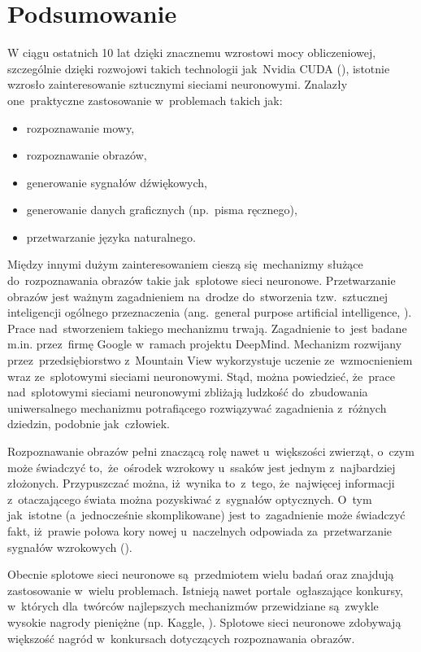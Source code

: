 \chapter{Podsumowanie}
W ciągu ostatnich 10 lat dzięki znacznemu wzrostowi mocy obliczeniowej, szczególnie dzięki rozwojowi takich technologii
jak~Nvidia CUDA (\cite{nvidia-cuda}), istotnie wzrosło zainteresowanie sztucznymi sieciami neuronowymi. Znalazły
one~praktyczne zastosowanie w~problemach takich jak:
\begin{itemize}
    \item rozpoznawanie mowy,
    \item rozpoznawanie obrazów,
    \item generowanie sygnałów dźwiękowych,
    \item generowanie danych graficznych (np.~pisma ręcznego),
    \item przetwarzanie języka naturalnego.
\end{itemize}

Między innymi dużym zainteresowaniem cieszą się~mechanizmy służące do~rozpoznawania obrazów takie jak~splotowe sieci
neuronowe. Przetwarzanie obrazów jest ważnym zagadnieniem na~drodze do~stworzenia tzw.~sztucznej inteligencji ogólnego
przeznaczenia (ang.~general purpose artificial intelligence, \cite{strong-AI}). Prace nad~stworzeniem takiego mechanizmu
trwają. Zagadnienie to~jest badane m.in. przez~firmę Google w~ramach projektu DeepMind. Mechanizm rozwijany
przez~przedsiębiorstwo z~Mountain View wykorzystuje uczenie ze~wzmocnieniem wraz ze~splotowymi sieciami neuronowymi.
Stąd, można powiedzieć, że~prace nad~splotowymi sieciami neuronowymi zbliżają ludzkość do~zbudowania uniwersalnego
mechanizmu potrafiącego rozwiązywać zagadnienia z~różnych dziedzin, podobnie jak~człowiek.

Rozpoznawanie obrazów pełni znaczącą rolę nawet u~większości zwierząt, o~czym może świadczyć to,~że~ośrodek wzrokowy
u~ssaków jest jednym z~najbardziej złożonych. Przypuszczać można, iż~wynika to~z~tego, że~najwięcej informacji
z~otaczającego świata można pozyskiwać z~sygnałów optycznych. O~tym jak~istotne (a~jednocześnie skomplikowane) jest
to~zagadnienie może świadczyć fakt, iż~prawie połowa kory nowej u~naczelnych odpowiada za~przetwarzanie sygnałów
wzrokowych (\cite{primate-cerebral-cortex}).

Obecnie splotowe sieci neuronowe są~przedmiotem wielu badań oraz znajdują zastosowanie w~wielu problemach. Istnieją
nawet portale~ogłaszające konkursy, w~których dla~twórców najlepszych mechanizmów przewidziane są~zwykle wysokie nagrody
pieniężne (np. Kaggle, \cite{kaggle-competitions}). Splotowe sieci neuronowe zdobywają większość nagród w~konkursach
dotyczących rozpoznawania obrazów.

